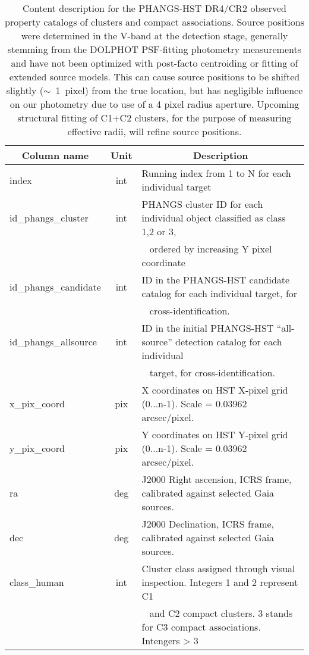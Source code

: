 %
\begin{table*}
\centering
\caption{Content description for the PHANGS-HST DR4/CR2 observed property catalogs of clusters and compact associations.  Source positions were determined in the V-band at the detection stage, generally stemming from the \textsc{DOLPHOT} PSF-fitting photometry measurements and have not been optimized with post-facto centroiding or fitting of extended source models.  This can cause source positions to be shifted slightly ($\sim$~1~pixel) from the true location, but has negligible influence on our photometry due to use of a 4 pixel radius aperture. Upcoming structural fitting of C1+C2 clusters, for the purpose of measuring effective radii, will refine source positions.}
\label{tab:cat_content}
\begin{tabular}{lcl}
\hline\hline
\multicolumn{1}{c}{Column name} & \multicolumn{1}{c}{Unit} & \multicolumn{1}{c}{Description} \\ 
\hline
index & int & Running index from 1 to N for each individual target \\ 
id\_phangs\_cluster & int & PHANGS cluster ID for each individual object classified as class 1,2 or 3, \\ 
 &  &  \,\,\, ordered by increasing Y pixel coordinate \\ 
id\_phangs\_candidate & int & ID in the PHANGS-HST candidate catalog for each individual target, for \\ 
 &  &  \,\,\, cross-identification. \\ 
id\_phangs\_allsource & int & ID in the initial PHANGS-HST “all-source” detection catalog for each individual \\ 
 &  &  \,\,\, target, for cross-identification. \\ 
x\_pix\_coord & pix & X coordinates on HST X-pixel grid (0...n-1). Scale = 0.03962 arcsec/pixel. \\ 
y\_pix\_coord & pix & Y coordinates on HST Y-pixel grid (0...n-1). Scale = 0.03962 arcsec/pixel. \\ 
ra & deg & J2000 Right ascension, ICRS frame, calibrated against selected Gaia sources. \\ 
dec & deg & J2000 Declination, ICRS frame, calibrated against selected Gaia sources. \\ 
class\_human & int & Cluster class assigned through visual inspection. Integers 1 and 2 represent C1 \\ 
 &  &  \,\,\, and C2 compact clusters. 3 stands for C3 compact associations. Intengers > 3 \\ 

\end{tabular}
\end{table*}
